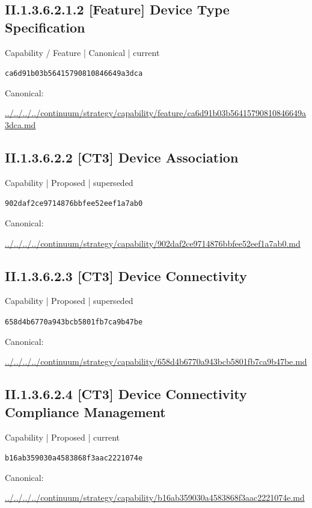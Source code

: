 \documentclass[10pt,a4paper]{article}
\begin{document}
\subsection*{II.1.3.6.2.1.2 [Feature] Device Type Specification}
{\small Capability / Feature | Canonical | current}\par
\texttt{ca6d91b03b56415790810846649a3dca}\par
Canonical: \par
{\footnotesize\url{../../../../continuum/strategy/capability/feature/ca6d91b03b56415790810846649a3dca.md}}\par
\subsection*{II.1.3.6.2.2 [CT3] Device Association}
{\small Capability | Proposed | superseded}\par
\texttt{902daf2ce9714876bbfee52eef1a7ab0}\par
Canonical: \par
{\footnotesize\url{../../../../continuum/strategy/capability/902daf2ce9714876bbfee52eef1a7ab0.md}}\par
\subsection*{II.1.3.6.2.3 [CT3] Device Connectivity}
{\small Capability | Proposed | superseded}\par
\texttt{658d4b6770a943bcb5801fb7ca9b47be}\par
Canonical: \par
{\footnotesize\url{../../../../continuum/strategy/capability/658d4b6770a943bcb5801fb7ca9b47be.md}}\par
\subsection*{II.1.3.6.2.4 [CT3] Device Connectivity Compliance Management}
{\small Capability | Proposed | current}\par
\texttt{b16ab359030a4583868f3aac2221074e}\par
Canonical: \par
{\footnotesize\url{../../../../continuum/strategy/capability/b16ab359030a4583868f3aac2221074e.md}}\par
\end{document}
